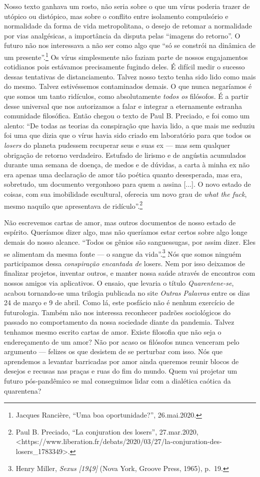 Nosso texto ganhava um rosto, não seria sobre o que um vírus poderia
trazer de utópico ou distópico, mas sobre o conflito entre isolamento
compulsório e normalidade da forma de vida metropolitana, o desejo de
retomar a normalidade por vias analgésicas, a importância da disputa
pelas ``imagens do retorno''. O futuro não nos interessava a não ser
como algo que ``só se constrói na dinâmica de um presente''.\footnote{Jacques
  Rancière, ``Uma boa oportunidade?'', 26.mai.2020.}
Os vírus simplesmente não faziam parte de nossos engajamentos cotidianos
pois estávamos precisamente fugindo deles. É difícil medir o sucesso
dessas tentativas de distanciamento. Talvez nosso texto tenha sido lido
como mais do mesmo. Talvez estivéssemos contaminados demais. O que nunca
negaríamos é que somos um tanto ridículos, como absolutamente
\emph{todos os} filósofos. É a partir desse universal que nos
autorizamos a falar e integrar a eternamente estranha comunidade
filosófica. Então chegou o texto de Paul B. Preciado, e foi como um
alento: ``De todas as teorias da conspiração que havia lido, a que mais
me seduziu foi uma que dizia que o vírus havia sido criado em
laboratório para que todos os \emph{losers} do planeta pudessem
recuperar seus e suas ex --- mas sem qualquer obrigação de retorno
verdadeiro. Estufado de lirismo e de angústia acumulados durante uma
semana de doença, de medos e de dúvidas, a carta à minha ex não era
apenas uma declaração de amor tão poética quanto desesperada, mas era,
sobretudo, um documento vergonhoso para quem a assina {[}...{]}. O novo
estado de coisas, com sua imobilidade escultural, oferecia um novo grau
de \emph{what the fuck}, mesmo naquilo que apresentava de
ridículo''.\footnote{Paul B. Preciado, ``La conjuration des losers'',
  27.mar.2020,
  \textless{}https://www.liberation.fr/debats/2020/03/27/la-conjuration-des-losers\_1783349{\textgreater{}.}}

Não escrevemos cartas de amor, mas outros documentos de nosso estado de
espírito. Queríamos dizer algo, mas não queríamos estar certos sobre
algo longe demais do nosso alcance. ``Todos os gênios são sanguessugas,
por assim dizer. Eles se alimentam da mesma fonte --- o sangue da
vida''.\footnote{Henry Miller, \emph{Sexus {[}1949{]}} (Nova York,
  Groove Press, 1965), p.~19.} Nós que somos ninguém participamos dessa
\emph{conspiração encantada de} losers. Nem por isso deixamos de
finalizar projetos, inventar outros, e manter nossa saúde através de
encontros com nossos amigos via aplicativos. O ensaio, que levaria o
título \emph{Quarentene-se}, acabou tornando-se uma trilogia publicada
no site \emph{Outras Palavras} entre os dias 24 de março e 9 de abril.
Como lá, este posfácio não é nenhum exercício de futurologia. Também não
nos interessa reconhecer padrões sociológicos do passado no
comportamento da nossa sociedade diante da pandemia. Talvez tenhamos
mesmo escrito cartas de amor. Existe filosofia que não seja o
endereçamento de um amor? Não por acaso os filósofos nunca venceram pelo
argumento --- felizes os que desistem de se perturbar com isso. Nós que
aprendemos a levantar barricadas por amor ainda queremos reunir blocos
de desejos e recusas nas praças e ruas do fim do mundo. Quem vai
projetar um futuro pós-pandêmico se mal conseguimos lidar com a
dialética caótica da quarentena?

